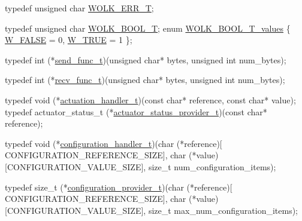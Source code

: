 \begin{DoxyCodeInclude}
\textcolor{keyword}{typedef} \textcolor{keywordtype}{unsigned} \textcolor{keywordtype}{char} \hyperlink{wolk__connector_8h_a5e8017d60f3753b4d489aeb7d3392641}{WOLK\_ERR\_T};

\textcolor{keyword}{typedef} \textcolor{keywordtype}{unsigned} \textcolor{keywordtype}{char} \hyperlink{wolk__connector_8h_a8b01c4c1e6c1d8d91197fb49c642c4ef}{WOLK\_BOOL\_T};
\textcolor{keyword}{enum} \hyperlink{wolk__connector_8h_a19b47d3264771c75e27cf2b2617546af}{WOLK\_BOOL\_T\_values} \{ \hyperlink{wolk__connector_8h_a19b47d3264771c75e27cf2b2617546afa0abf1977616eb22dc9af960a3a664376}{W\_FALSE} = 0, \hyperlink{wolk__connector_8h_a19b47d3264771c75e27cf2b2617546afa93fad5ad6fdb521eabff2efa8934f722}{W\_TRUE} = 1 \};

\textcolor{keyword}{typedef} int (*\hyperlink{wolk__connector_8h_a830662686699e21c1280f63d2ec80faf}{send\_func\_t})(\textcolor{keywordtype}{unsigned} \textcolor{keywordtype}{char}* bytes, \textcolor{keywordtype}{unsigned} \textcolor{keywordtype}{int} num\_bytes);

\textcolor{keyword}{typedef} int (*\hyperlink{wolk__connector_8h_ac6f167182b7b63052d13946a6c4fba06}{recv\_func\_t})(\textcolor{keywordtype}{unsigned} \textcolor{keywordtype}{char}* bytes, \textcolor{keywordtype}{unsigned} \textcolor{keywordtype}{int} num\_bytes);

\textcolor{keyword}{typedef} void (*\hyperlink{wolk__connector_8h_acde87869e807b1774680f3f2b5b04e2f}{actuation\_handler\_t})(\textcolor{keyword}{const} \textcolor{keywordtype}{char}* reference, \textcolor{keyword}{const} \textcolor{keywordtype}{char}* value);
\textcolor{keyword}{typedef} actuator\_status\_t (*\hyperlink{wolk__connector_8h_af3e8919a04a293972b64605557287537}{actuator\_status\_provider\_t})(\textcolor{keyword}{const} \textcolor{keywordtype}{char}* reference);

\textcolor{keyword}{typedef} void (*\hyperlink{wolk__connector_8h_a6662d0d41546795466cc2b398d8dcb08}{configuration\_handler\_t})(char (*reference)[
      CONFIGURATION\_REFERENCE\_SIZE],
                                        char (*value)[CONFIGURATION\_VALUE\_SIZE], \textcolor{keywordtype}{size\_t} 
      num\_configuration\_items);

\textcolor{keyword}{typedef} size\_t (*\hyperlink{wolk__connector_8h_a64d56254d09f9e452751f32b3c5a39d3}{configuration\_provider\_t})(char (*reference)[
      CONFIGURATION\_REFERENCE\_SIZE],
                                           char (*value)[CONFIGURATION\_VALUE\_SIZE], \textcolor{keywordtype}{size\_t} 
      max\_num\_configuration\_items);


\end{DoxyCodeInclude}
